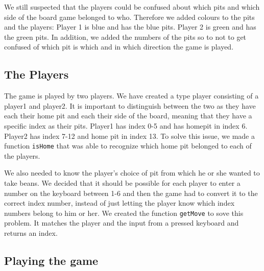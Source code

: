 \documentclass[a4paper]{report}
\begin{document}
We still suspected that the players could be confused about which pits and 
which side of the board game belonged to who. Therefore we added colours to the
pits and the players: Player 1 is blue and has the blue pits. Player 2 is green
 and has the green pits. In addition, we added the numbers of the pits so to 
not to get confused of which pit is which and in which direction the game is played.

\subsection*{The Players}
The game is played by two players. We have created a type player consisting of a player1 and player2. It is important to distinguish between the two as they have each their home pit and each their side of the board, meaning that they have a specific index as their pits. Player1 has index 0-5 and has homepit in index 6. Player2 has index 7-12 and home pit in index 13. To solve this issue, we made a function \texttt{isHome} that was able to recognize which home pit belonged to each of the players. 

We also needed to know the player's choice of pit from which he or she wanted to take beans. We decided that it should be possible for each player to enter a number on the keyboard between 1-6 and then the game had to convert it to the correct index number, instead of just letting the player know which index numbers belong to him or her. We created the function \texttt{getMove} to sove this problem. It matches the player and the input from a pressed keyboard and returns an index.

\subsection*{Playing the game}
\end{document}
